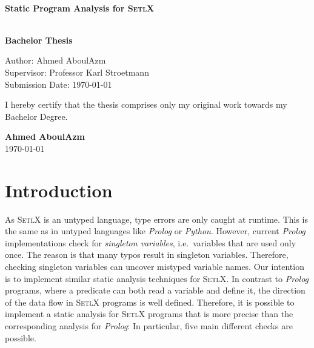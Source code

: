 \documentclass[11pt]{report}
\begin{document}
\begin{center}
\vspace{2cm}
\\
\begin{huge}
\textbf{Static Program Analysis for \textsc{SetlX}}
\end{huge}
\\[2cm]
\textbf{Bachelor Thesis}
\begin{tabbing}\hspace{5cm}
Author: Ahmed AboulAzm\\\hspace{5cm}
Supervisor: Professor Karl Stroetmann\\\hspace{5cm}
Submission Date: {\today}
\end{tabbing}
\end{center}
\vspace{1.5cm}
I hereby certify that the thesis comprises only my original work towards my Bachelor Degree.
\begin{flushright}
\textbf{Ahmed AboulAzm}\\
\today
\end{flushright}

\tableofcontents


\chapter{Introduction}
As \textsc{SetlX} is an untyped language, type errors are only caught at runtime.  This is the same
as in untyped languages like \textsl{Prolog} or \textsl{Python}.  However, current \textsl{Prolog}
implementations check for \emph{singleton variables}, i.e.~variables that are used only once.  The
reason is that many typos result in singleton variables.  Therefore, checking singleton variables
can uncover mistyped variable names.  Our intention 
is to implement similar static analysis techniques for \textsc{SetlX}.  In contrast to
\textsl{Prolog} programs, where a predicate can both read a variable and define it, the direction of
the data flow in \textsc{SetlX} programs is well defined.  Therefore, it is possible to implement a
static analysis for \textsc{SetlX} programs that is more precise than the corresponding analysis for
\textsl{Prolog}:  In particular, five main different checks are possible.
\end{document}
